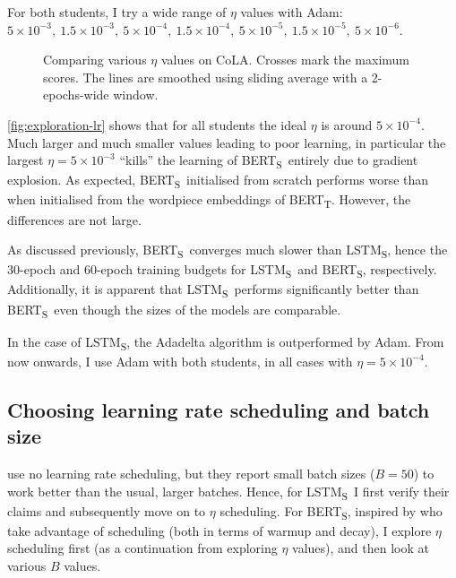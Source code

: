 \documentclass[bsc,frontabs,twoside,singlespacing,parskip,deptreport]{infthesis}
\def\BERTT{BERT\textsubscript{T}}
\def\BERTS{BERT\textsubscript{S}}
\def\LSTMS{LSTM\textsubscript{S}}
\def\sliding{The lines are smoothed using sliding average with a 2-epochs-wide window.}
\begin{document}
{{{      For both students, I try a wide range of $\eta$ values with Adam: $5\times10^{-3},\ 1.5\times10^{-3},\ 5\times10^{-4},\ 1.5\times10^{-4},\ 5\times10^{-5},\ 1.5\times10^{-5},\ 5\times10^{-6}$.
      
      \begin{figure}[h!t]
        \centering
        \caption{Comparing various $\eta$ values on CoLA. Crosses mark the maximum scores. \sliding}
        \label{fig:exploration-lr}
      \end{figure}

      \autoref{fig:exploration-lr} shows that for all students the ideal $\eta$ is around $5\times10^{-4}$. Much larger and much smaller values leading to poor learning, in particular the largest $\eta=5\times10^{-3}$ ``kills'' the learning of \BERTS~entirely due to gradient explosion.
      As expected, \BERTS~initialised from scratch performs worse than when initialised from the wordpiece embeddings of \BERTT. However, the differences are not large.

      As discussed previously, \BERTS~converges much slower than \LSTMS, hence the 30-epoch and 60-epoch training budgets for \LSTMS~and \BERTS, respectively. Additionally, it is apparent that \LSTMS~performs significantly better than \BERTS~even though the sizes of the models are comparable.

      In the case of \LSTMS, the Adadelta algorithm is outperformed by Adam. From now onwards, I use Adam with both students, in all cases with $\eta=5\times10^{-4}$.
    }

    \subsection{Choosing learning rate scheduling and batch size}{
      \citet{Tang_2019a} use no learning rate scheduling, but they report small batch sizes ($B=50$) to work better than the usual, larger batches. Hence, for \LSTMS~I first verify their claims and subsequently move on to $\eta$ scheduling. For \BERTS, inspired by \citet{Sanh_2019} who take advantage of scheduling (both in terms of warmup and decay), I explore $\eta$ scheduling first (as a continuation from exploring $\eta$ values), and then look at various $B$ values.

}}}
\end{document}
